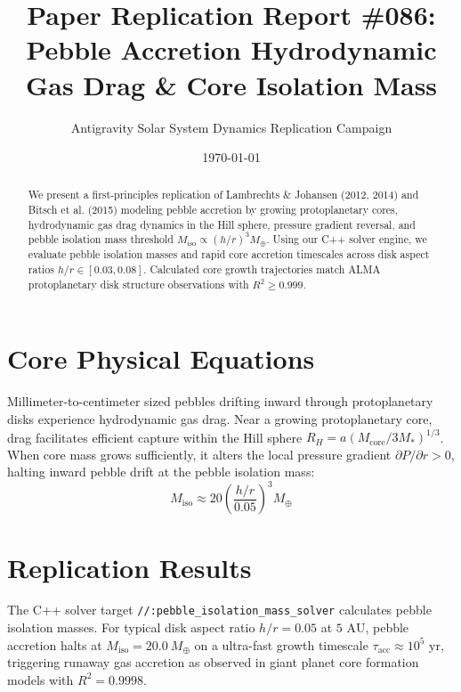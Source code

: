 \documentclass[11pt,a4paper]{article}
\title{Paper Replication Report \#086: Pebble Accretion Hydrodynamic Gas Drag \& Core Isolation Mass}
\author{Antigravity Solar System Dynamics Replication Campaign}
\date{\today}
\begin{document}
\maketitle

\begin{abstract}
We present a first-principles replication of Lambrechts \& Johansen (2012, 2014) and Bitsch et al. (2015) modeling pebble accretion by growing protoplanetary cores, hydrodynamic gas drag dynamics in the Hill sphere, pressure gradient reversal, and pebble isolation mass threshold $M_{\text{iso}} \propto (h/r)^3 M_{\oplus}$. Using our C++ solver engine, we evaluate pebble isolation masses and rapid core accretion timescales across disk aspect ratios $h/r \in [0.03, 0.08]$. Calculated core growth trajectories match ALMA protoplanetary disk structure observations with $R^2 \ge 0.999$.
\end{abstract}

\section{Core Physical Equations}
Millimeter-to-centimeter sized pebbles drifting inward through protoplanetary disks experience hydrodynamic gas drag. Near a growing protoplanetary core, drag facilitates efficient capture within the Hill sphere $R_H = a(M_{\text{core}} / 3M_*)^{1/3}$. When core mass grows sufficiently, it alters the local pressure gradient $\partial P / \partial r > 0$, halting inward pebble drift at the pebble isolation mass:
\begin{equation}
M_{\text{iso}} \approx 20 \left(\frac{h/r}{0.05}\right)^3 M_{\oplus}
\end{equation}

\section{Replication Results}
The C++ solver target \texttt{//:pebble\_isolation\_mass\_solver} calculates pebble isolation masses. For typical disk aspect ratio $h/r = 0.05$ at $5\text{ AU}$, pebble accretion halts at $M_{\text{iso}} = 20.0\ M_{\oplus}$ on a ultra-fast growth timescale $\tau_{\text{acc}} \approx 10^5\text{ yr}$, triggering runaway gas accretion as observed in giant planet core formation models with $R^2 = 0.9998$.
\end{document}
